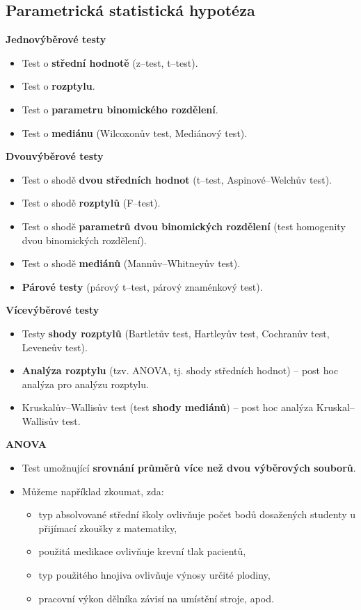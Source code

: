 \subsection{Parametrická statistická hypotéza}
\textbf{Jednovýběrové testy}
\begin{itemize}
    \item Test o \textbf{střední hodnotě} (z--test, t--test).
    \item Test o \textbf{rozptylu}.
    \item Test o \textbf{parametru binomického rozdělení}.
    \item Test o \textbf{mediánu} (Wilcoxonův test, Mediánový test).
\end{itemize}
\textbf{Dvouvýběrové testy}
\begin{itemize}
    \item Test o shodě \textbf{dvou středních hodnot} (t--test, Aspinové--Welchův test).
    \item Test o shodě \textbf{rozptylů} (F--test).
    \item Test o shodě \textbf{parametrů dvou binomických rozdělení} (test homogenity dvou binomických rozdělení).
    \item Test o shodě \textbf{mediánů} (Mannův--Whitneyův test).
    \item \textbf{Párové testy} (párový t--test, párový znaménkový test).
\end{itemize}
\textbf{Vícevýběrové testy}
\begin{itemize}
    \item Testy \textbf{shody rozptylů} (Bartletův test, Hartleyův test, Cochranův test, Leveneův test).
    \item \textbf{Analýza rozptylu} (tzv. ANOVA, tj. shody středních hodnot) -- post hoc analýza pro analýzu rozptylu.
    \item Kruskalův--Wallisův test (test \textbf{shody mediánů}) -- post hoc analýza Kruskal--Wallisův test.
\end{itemize}
\textbf{ANOVA}
\begin{itemize}
    \item Test umožnující \textbf{srovnání průměrů více než dvou výběrových souborů}.
    \item Můžeme například zkoumat, zda:
          \begin{itemize}
              \item typ absolvované střední školy ovlivňuje počet bodů dosažených studenty u přijímací zkoušky z matematiky,
              \item použitá medikace ovlivňuje krevní tlak pacientů,
              \item typ použitého hnojiva ovlivňuje výnosy určité plodiny,
              \item pracovní výkon dělníka závisí na umístění stroje, apod.
          \end{itemize}
\end{itemize}